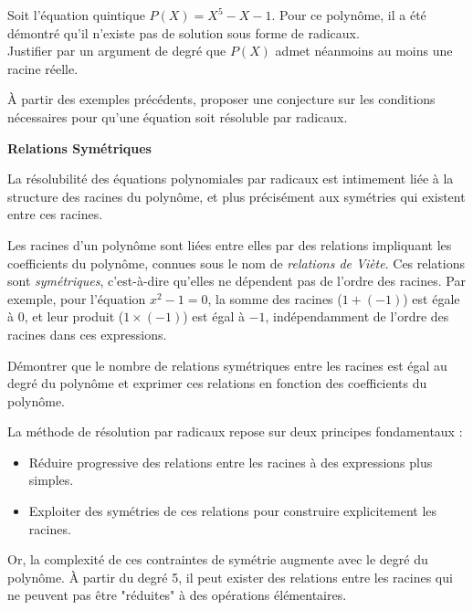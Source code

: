 \documentclass[10pt,a4paper]{article}
\begin{document}
\q Soit l'équation quintique \( P(X) = X^5 - X - 1 \). Pour ce polynôme, il a été démontré qu'il
n'existe pas de solution sous forme de radicaux.\\
Justifier par un argument de degré que \( P(X) \) admet néanmoins au moins une racine réelle.

\q À partir des exemples précédents, proposer une conjecture sur les conditions nécessaires pour
qu'une équation soit résoluble par radicaux.

\bigskip
\textbf{Relations Symétriques}

La résolubilité des équations polynomiales par radicaux est intimement liée à la structure des
racines du polynôme, et plus précisément aux symétries qui existent entre ces racines.

Les racines d'un polynôme sont liées entre elles par des relations impliquant les coefficients du
polynôme, connues sous le nom de \textit{relations de Viète}. Ces relations sont
\textit{symétriques}, c'est-à-dire qu'elles ne dépendent pas de l'ordre des racines. Par exemple,
pour l'équation $x^2 - 1 = 0$, la somme des racines ($1 + (-1)$) est égale à $0$, et leur produit
($1 \times (-1)$) est égal à $-1$, indépendamment de l'ordre des racines dans ces expressions.

\q Démontrer que le nombre de relations symétriques entre les racines est égal au degré du polynôme
et exprimer ces relations en fonction des coefficients du polynôme.

\bigskip
La méthode de résolution par radicaux repose sur deux principes fondamentaux :
\begin{itemize}
    \item Réduire progressive des relations entre les racines à des expressions plus simples.
    \item Exploiter des symétries de ces relations pour construire explicitement les racines.
\end{itemize}

Or, la complexité de ces contraintes de symétrie augmente avec le degré du polynôme. À partir du
degré 5, il peut exister des relations entre les racines qui ne peuvent pas être "réduites" à des
opérations élémentaires.
\end{document}
